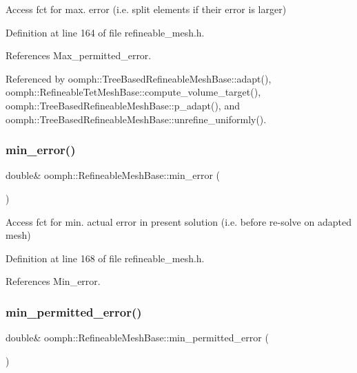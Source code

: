 Access fct for max. error (i.\+e. split elements if their error is larger) 



Definition at line 164 of file refineable\+\_\+mesh.\+h.



References Max\+\_\+permitted\+\_\+error.



Referenced by oomph\+::\+Tree\+Based\+Refineable\+Mesh\+Base\+::adapt(), oomph\+::\+Refineable\+Tet\+Mesh\+Base\+::compute\+\_\+volume\+\_\+target(), oomph\+::\+Tree\+Based\+Refineable\+Mesh\+Base\+::p\+\_\+adapt(), and oomph\+::\+Tree\+Based\+Refineable\+Mesh\+Base\+::unrefine\+\_\+uniformly().

\mbox{\label{classoomph_1_1RefineableMeshBase_a60baf0add6d015ca4248622ce21ae09f}} 
\subsubsection{\texorpdfstring{min\+\_\+error()}{min\_error()}}
{\footnotesize\ttfamily double\& oomph\+::\+Refineable\+Mesh\+Base\+::min\+\_\+error (\begin{DoxyParamCaption}{ }\end{DoxyParamCaption})\hspace{0.3cm}{\ttfamily [inline]}}



Access fct for min. actual error in present solution (i.\+e. before re-\/solve on adapted mesh) 



Definition at line 168 of file refineable\+\_\+mesh.\+h.



References Min\+\_\+error.

\mbox{\label{classoomph_1_1RefineableMeshBase_ad3a13bfaf687135d0154ce2f9b60edb7}} 
\subsubsection{\texorpdfstring{min\+\_\+permitted\+\_\+error()}{min\_permitted\_error()}}
{\footnotesize\ttfamily double\& oomph\+::\+Refineable\+Mesh\+Base\+::min\+\_\+permitted\+\_\+error (\begin{DoxyParamCaption}{ }\end{DoxyParamCaption})\hspace{0.3cm}{\ttfamily [inline]}}



